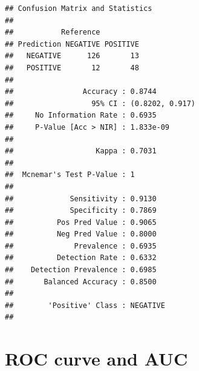 \documentclass[
]{article}
\begin{document}
\begin{verbatim}
## Confusion Matrix and Statistics
## 
##           Reference
## Prediction NEGATIVE POSITIVE
##   NEGATIVE      126       13
##   POSITIVE       12       48
##                                          
##                Accuracy : 0.8744         
##                  95% CI : (0.8202, 0.917)
##     No Information Rate : 0.6935         
##     P-Value [Acc > NIR] : 1.833e-09      
##                                          
##                   Kappa : 0.7031         
##                                          
##  Mcnemar's Test P-Value : 1              
##                                          
##             Sensitivity : 0.9130         
##             Specificity : 0.7869         
##          Pos Pred Value : 0.9065         
##          Neg Pred Value : 0.8000         
##              Prevalence : 0.6935         
##          Detection Rate : 0.6332         
##    Detection Prevalence : 0.6985         
##       Balanced Accuracy : 0.8500         
##                                          
##        'Positive' Class : NEGATIVE       
## 
\end{verbatim}

\section{ROC curve and AUC}\label{roc-curve-and-auc-1}
\end{document}
